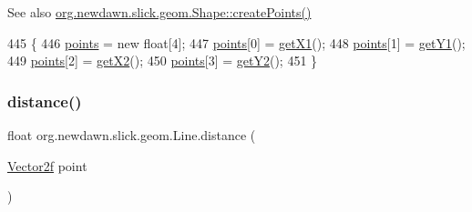 \begin{DoxySeeAlso}{See also}
\mbox{\hyperlink{classorg_1_1newdawn_1_1slick_1_1geom_1_1_shape_a2f5907ca87e87f8794161f46389ff8c8}{org.\+newdawn.\+slick.\+geom.\+Shape\+::create\+Points()}} 
\end{DoxySeeAlso}

\begin{DoxyCode}
445                                   \{
446         \mbox{\hyperlink{classorg_1_1newdawn_1_1slick_1_1geom_1_1_shape_a8b4d4058734bbb3b96072e470b92aa37}{points}} = \textcolor{keyword}{new} \textcolor{keywordtype}{float}[4];
447         \mbox{\hyperlink{classorg_1_1newdawn_1_1slick_1_1geom_1_1_shape_a8b4d4058734bbb3b96072e470b92aa37}{points}}[0] = \mbox{\hyperlink{classorg_1_1newdawn_1_1slick_1_1geom_1_1_line_abebfc0375201e6d648fd559c9c96e6ee}{getX1}}();
448         \mbox{\hyperlink{classorg_1_1newdawn_1_1slick_1_1geom_1_1_shape_a8b4d4058734bbb3b96072e470b92aa37}{points}}[1] = \mbox{\hyperlink{classorg_1_1newdawn_1_1slick_1_1geom_1_1_line_a2f4636a722a94d4f7f458cb8d757e076}{getY1}}();
449         \mbox{\hyperlink{classorg_1_1newdawn_1_1slick_1_1geom_1_1_shape_a8b4d4058734bbb3b96072e470b92aa37}{points}}[2] = \mbox{\hyperlink{classorg_1_1newdawn_1_1slick_1_1geom_1_1_line_a3c1e716e9f47d052d6f54bb60ba421a2}{getX2}}();
450         \mbox{\hyperlink{classorg_1_1newdawn_1_1slick_1_1geom_1_1_shape_a8b4d4058734bbb3b96072e470b92aa37}{points}}[3] = \mbox{\hyperlink{classorg_1_1newdawn_1_1slick_1_1geom_1_1_line_a70e1c978a726e6bc1bc9742592eeba37}{getY2}}();
451     \}
\end{DoxyCode}
\mbox{\label{classorg_1_1newdawn_1_1slick_1_1geom_1_1_line_a43d8070c66d7d1df7a89cc740b001bd6}} 
\subsubsection{\texorpdfstring{distance()}{distance()}}
{\footnotesize\ttfamily float org.\+newdawn.\+slick.\+geom.\+Line.\+distance (\begin{DoxyParamCaption}\item[{\mbox{\hyperlink{classorg_1_1newdawn_1_1slick_1_1geom_1_1_vector2f}{Vector2f}}}]{point }\end{DoxyParamCaption})\hspace{0.3cm}{\ttfamily [inline]}}

